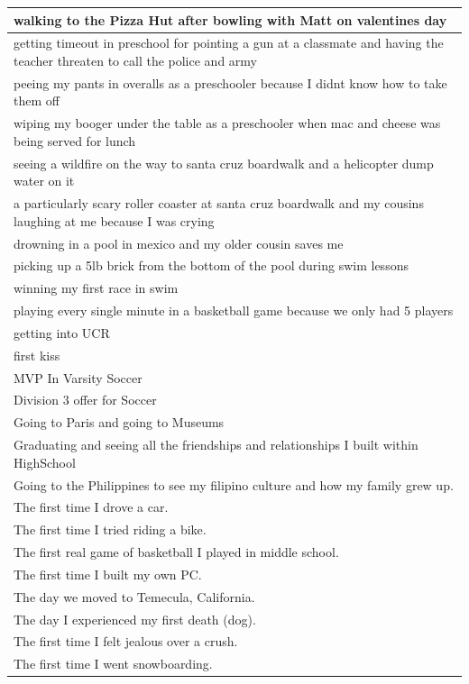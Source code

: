 \documentclass[
  .7em,
  letterpaper,
  DIV=11,
  numbers=noendperiod]{scrartcl}
\begin{document}
\begin{table}
\begin{tabular}{l}
\hline
walking to the Pizza Hut after bowling with Matt on valentines day\\
\hline
getting timeout in preschool for pointing a gun at a classmate and having the teacher threaten to call the police and army\\
\hline
peeing my pants in overalls as a preschooler because I didnt know how to take them off\\
\hline
wiping my booger under the table as a preschooler when mac and cheese was being served for lunch\\
\hline
seeing a wildfire on the way to santa cruz boardwalk and a helicopter dump water on it\\
\hline
a particularly scary roller coaster at santa cruz boardwalk and my cousins laughing at me because I was crying\\
\hline
drowning in a pool in mexico and my older cousin saves me\\
\hline
picking up a 5lb brick from the bottom of the pool during swim lessons\\
\hline
winning my first race in swim\\
\hline
playing every single minute in a basketball game because we only had 5 players\\
\hline
getting into UCR\\
\hline
first kiss\\
\hline
MVP In Varsity Soccer\\
\hline
Division 3 offer for Soccer\\
\hline
Going to Paris and going to Museums\\
\hline
Graduating and seeing all the friendships and relationships I built within HighSchool\\
\hline
Going to the Philippines to see my filipino culture and how my family grew up.\\
\hline
The first time I drove a car.\\
\hline
The first time I tried riding a bike.\\
\hline
The first real game of basketball I played in middle school.\\
\hline
The first time I built my own PC.\\
\hline
The day we moved to Temecula, California.\\
\hline
The day I experienced my first death (dog).\\
\hline
The first time I felt jealous over a crush.\\
\hline
The first time I went snowboarding.\\

\end{tabular}
\end{table}
\end{document}
